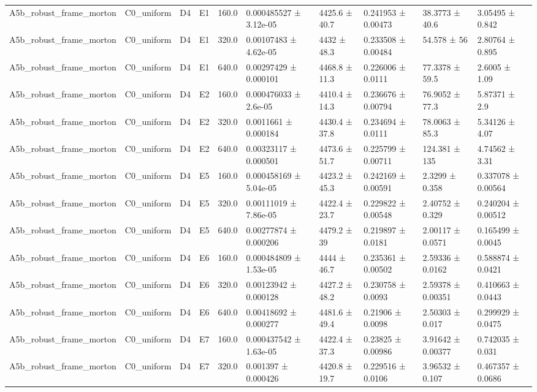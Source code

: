 \begin{table}
\begin{tabular}{llllllllll}
A5b\_robust\_frame\_morton & C0\_uniform & D4 & E1 & 160.0 & 0.000485527 ± 3.12e-05 & 4425.6 ± 40.7 & 0.241953 ± 0.00473 & 38.3773 ± 40.6 & 3.05495 ± 0.842 \\
A5b\_robust\_frame\_morton & C0\_uniform & D4 & E1 & 320.0 & 0.00107483 ± 4.62e-05 & 4432 ± 48.3 & 0.233508 ± 0.00484 & 54.578 ± 56 & 2.80764 ± 0.895 \\
A5b\_robust\_frame\_morton & C0\_uniform & D4 & E1 & 640.0 & 0.00297429 ± 0.000101 & 4468.8 ± 11.3 & 0.226006 ± 0.0111 & 77.3378 ± 59.5 & 2.6005 ± 1.09 \\
A5b\_robust\_frame\_morton & C0\_uniform & D4 & E2 & 160.0 & 0.000476033 ± 2.6e-05 & 4410.4 ± 14.3 & 0.236676 ± 0.00794 & 76.9052 ± 77.3 & 5.87371 ± 2.9 \\
A5b\_robust\_frame\_morton & C0\_uniform & D4 & E2 & 320.0 & 0.0011661 ± 0.000184 & 4430.4 ± 37.8 & 0.234694 ± 0.0111 & 78.0063 ± 85.3 & 5.34126 ± 4.07 \\
A5b\_robust\_frame\_morton & C0\_uniform & D4 & E2 & 640.0 & 0.00323117 ± 0.000501 & 4473.6 ± 51.7 & 0.225799 ± 0.00711 & 124.381 ± 135 & 4.74562 ± 3.31 \\
A5b\_robust\_frame\_morton & C0\_uniform & D4 & E5 & 160.0 & 0.000458169 ± 5.04e-05 & 4423.2 ± 45.3 & 0.242169 ± 0.00591 & 2.3299 ± 0.358 & 0.337078 ± 0.00564 \\
A5b\_robust\_frame\_morton & C0\_uniform & D4 & E5 & 320.0 & 0.00111019 ± 7.86e-05 & 4422.4 ± 23.7 & 0.229822 ± 0.00548 & 2.40752 ± 0.329 & 0.240204 ± 0.00512 \\
A5b\_robust\_frame\_morton & C0\_uniform & D4 & E5 & 640.0 & 0.00277874 ± 0.000206 & 4479.2 ± 39 & 0.219897 ± 0.0181 & 2.00117 ± 0.0571 & 0.165499 ± 0.0045 \\
A5b\_robust\_frame\_morton & C0\_uniform & D4 & E6 & 160.0 & 0.000484809 ± 1.53e-05 & 4444 ± 46.7 & 0.235361 ± 0.00502 & 2.59336 ± 0.0162 & 0.588874 ± 0.0421 \\
A5b\_robust\_frame\_morton & C0\_uniform & D4 & E6 & 320.0 & 0.00123942 ± 0.000128 & 4427.2 ± 48.2 & 0.230758 ± 0.0093 & 2.59378 ± 0.00351 & 0.410663 ± 0.0443 \\
A5b\_robust\_frame\_morton & C0\_uniform & D4 & E6 & 640.0 & 0.00418692 ± 0.000277 & 4481.6 ± 49.4 & 0.21906 ± 0.0098 & 2.50303 ± 0.017 & 0.299929 ± 0.0475 \\
A5b\_robust\_frame\_morton & C0\_uniform & D4 & E7 & 160.0 & 0.000437542 ± 1.63e-05 & 4422.4 ± 37.3 & 0.23825 ± 0.00986 & 3.91642 ± 0.00377 & 0.742035 ± 0.031 \\
A5b\_robust\_frame\_morton & C0\_uniform & D4 & E7 & 320.0 & 0.001397 ± 0.000426 & 4420.8 ± 19.7 & 0.229516 ± 0.0106 & 3.96532 ± 0.107 & 0.467357 ± 0.0686 \\

\end{tabular}
\end{table}
